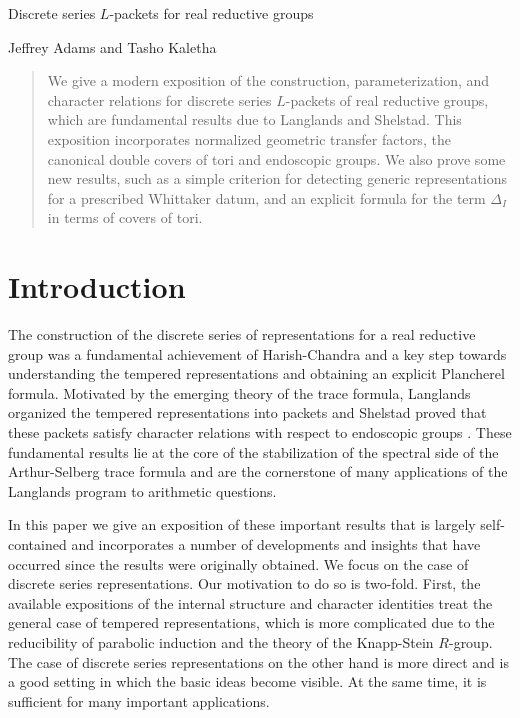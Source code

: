 \documentclass{article}
\theoremstyle{definition}
\numberwithin{equation}{section}
\renewcommand{\-}{\hyp{}}
\begin{document}
\begin{mytitle} Discrete series $L$\-packets for real reductive groups \end{mytitle}
\begin{center} Jeffrey Adams and Tasho Kaletha \end{center}

\begin{abstract}
We give a modern exposition of the construction, parameterization, and character relations for discrete series $L$\-packets of real reductive groups, which are fundamental results due to Langlands and Shelstad. This exposition incorporates normalized geometric transfer factors, the canonical double covers of tori and endoscopic groups. We also prove some new results, such as a simple criterion for detecting generic representations for a prescribed Whittaker datum, and an explicit formula for the term $\Delta_I$ in terms of covers of tori.
\end{abstract}

\tableofcontents

\section{Introduction}

The construction of the discrete series of representations  for a real reductive group was a fundamental achievement of Harish-Chandra and a key step towards understanding the tempered representations and obtaining an explicit Plancherel formula. Motivated by the emerging theory of the trace formula, Langlands organized the tempered representations into packets \cite{Lan89} and Shelstad proved that these packets satisfy character relations with respect to endoscopic groups \cite{She82}. These fundamental results lie at the core of the stabilization of the spectral side of the Arthur-Selberg trace formula and are the cornerstone of many applications of the Langlands program to arithmetic questions. 

In this paper we give an exposition of these important results that is largely self-contained and incorporates a number of developments and insights that have occurred since the results were originally obtained. We focus on the case of discrete series representations. Our motivation to do so is two-fold. First, the available expositions of the internal structure and character identities treat the general case of tempered representations, which is more complicated due to the reducibility of parabolic induction and the theory of the Knapp-Stein $R$-group. The case of discrete series representations on the other hand is more direct and is a good setting in which the basic ideas become visible. At the same time, it is sufficient for many important applications.
\end{document}
